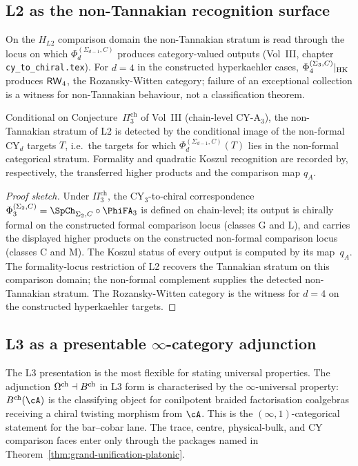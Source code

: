 \subsection{L2 as the non-Tannakian recognition surface}
\label{ssec:L2-non-tannakian}

On the $H_{L2}$ comparison domain the non-Tannakian stratum is read
through the locus on which $\Phi_d^{(\Sigma_{d-1},C)}$ produces
category-valued outputs (Vol~III, chapter
\texttt{cy\_to\_chiral.tex}). For $d = 4$ in the constructed
hyperkaehler cases, $\Phi_4^{(\Sigma_3,C)}|_{\mathrm{HK}}$ produces $\mathsf{RW}_4$,
the Rozansky-Witten category; failure of an exceptional collection is
a witness for non-Tannakian behaviour, not a classification theorem.

\begin{proposition}
\label{prop:L2-non-tannakian-platonic}
\ClaimStatusConditional
Conditional on Conjecture~$\Pi_3^{\mathrm{ch}}$ of
Vol~III (chain-level CY-A$_3$), the non-Tannakian stratum of L2
is detected by the conditional image of the non-formal CY$_d$ targets
$T$, i.e.\ the targets for which
$\Phi_d^{(\Sigma_{d-1},C)}(T)$ lies in the non-formal categorical
stratum.  Formality and quadratic Koszul recognition are recorded by,
respectively, the transferred higher products and the comparison map
$q_A$.
\end{proposition}

\begin{proof}[Proof sketch]
Under $\Pi_3^{\mathrm{ch}}$, the CY$_3$-to-chiral correspondence
$\Phi_3^{(\Sigma_2,C)}=\SpCh_{\Sigma_2,C}\circ\PhiFA_3$
is defined on chain-level; its output is chirally formal on the
constructed formal comparison locus (classes G and L), and carries
the displayed higher products on the constructed non-formal comparison
locus (classes C and M).  The Koszul status of every output is computed
by its map~$q_A$.  The formality-locus
restriction of L2 recovers the Tannakian stratum on this comparison
domain; the non-formal complement supplies the detected
non-Tannakian stratum. The Rozansky-Witten category is the witness for
$d=4$ on the constructed hyperkaehler targets.
\end{proof}

\subsection{L3 as a presentable $\infty$-category adjunction}
\label{ssec:L3-infinity}

The L3 presentation is the most flexible for stating universal
properties. The adjunction $\Omega^{\mathrm{ch}} \dashv B^{\mathrm{ch}}$ in L3 form is
characterised by the $\infty$-universal property: $\BCh(\cA)$ is
the classifying object for conilpotent braided factorisation
coalgebras receiving a chiral twisting morphism from $\cA$. This is
the $(\infty,1)$-categorical statement for the bar--cobar lane. The
trace, centre, physical-bulk, and CY comparison faces enter only
through the packages named in
Theorem~\ref{thm:grand-unification-platonic}.

